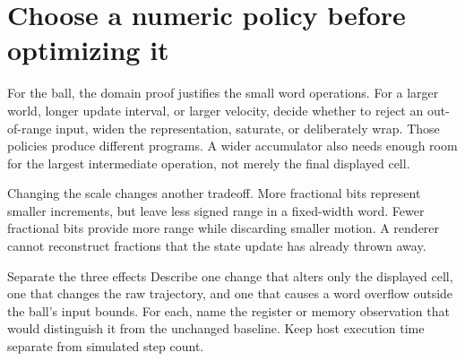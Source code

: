\section{Choose a numeric policy before optimizing it}
For the ball, the domain proof justifies the small word operations. For a larger
world, longer update interval, or larger velocity, decide whether to reject an
out-of-range input, widen the representation, saturate, or deliberately wrap.
Those policies produce different programs. A wider accumulator also needs enough
room for the largest intermediate operation, not merely the final displayed cell.

Changing the scale changes another tradeoff. More fractional bits represent
smaller increments, but leave less signed range in a fixed-width word. Fewer
fractional bits provide more range while discarding smaller motion. A renderer
cannot reconstruct fractions that the state update has already thrown away.

\begin{MARSExercise}{Separate the three effects}
  Describe one change that alters only the displayed cell, one that changes the raw
  trajectory, and one that causes a word overflow outside the ball's input bounds.
  For each, name the register or memory observation that would distinguish it from
  the unchanged baseline. Keep host execution time separate from simulated step count.
\end{MARSExercise}
